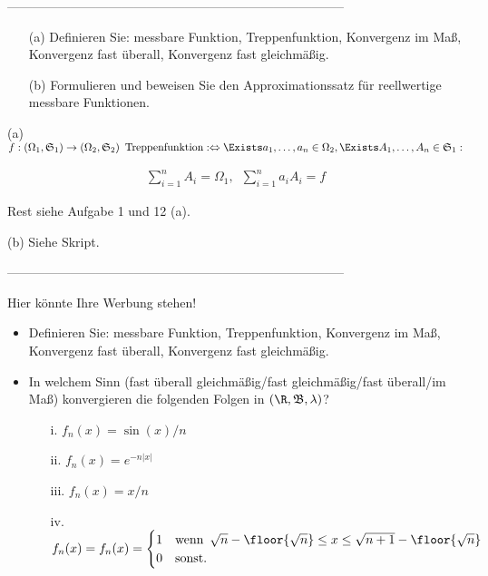 --------------------------------------------------------------------------------

\begin{exercise}

\begin{itemize}
  \item[(a)] Definieren Sie: messbare Funktion, Treppenfunktion, Konvergenz im Maß, Konvergenz fast überall, Konvergenz fast gleichmäßig.
  \item[(b)] Formulieren und beweisen Sie den Approximationssatz für reellwertige messbare Funktionen.
\end{itemize}

\end{exercise}

\begin{solution}

(a) $f: (\Omega_1, \mathfrak{S}_1) \to (\Omega_2, \mathfrak{S}_2) \enspace \text{Treppenfunktion}
: \Leftrightarrow
\Exists a_1, \ldots, a_n \in \Omega_2,
\Exists A_1, \ldots, A_n \in \mathfrak{S}_1:$

\begin{align*}
  \sum_{i=1}^n A_i = \Omega_1, \enspace
  \sum_{i=1}^n a_i A_i = f
\end{align*}

Rest siehe Aufgabe 1 und 12 (a).

(b) Siehe Skript.

\end{solution}

--------------------------------------------------------------------------------

\begin{exercise}

Hier könnte Ihre Werbung stehen!

\begin{itemize}
  \item Definieren Sie: messbare Funktion, Treppenfunktion, Konvergenz im Maß, Konvergenz fast überall, Konvergenz fast gleichmäßig.
  \item In welchem Sinn (fast überall gleichmäßig/fast gleichmäßig/fast überall/im Maß) konvergieren die folgenden Folgen in $(\R, \mathfrak{B}, \lambda)$?
  \begin{itemize}
    \item[i.] $f_n(x) = \sin(x)/n$
    \item[ii.] $f_n(x) = e^{-n |x|}$
    \item[iii.] $f_n(x) = x/n$
    \item[iv.] $f_n(x) = f_n(x) =
    \begin{cases}
      1 & \text{wenn} \enspace \sqrt{n} - \floor{\sqrt{n}} \leq x \leq \sqrt{n+1} - \floor{\sqrt{n}} \\
      0 & \text{sonst}.
    \end{cases}$
  \end{itemize}
\end{itemize}

\end{exercise}

